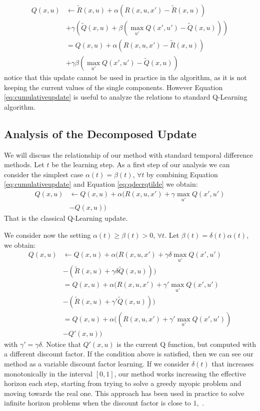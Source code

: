 \documentclass[conference]{IEEEtran}
\begin{document}
\begin{align}
Q(x,u) & \leftarrow\tilde{R}(x,u)+\alpha(R(x,u,x')-\tilde{R}(x,u)) \nonumber\\
 & +\gamma\left(\tilde{Q}(x,u)+\beta(\max_{u'}Q(x',u')-\tilde{Q}(x,u))\right) \nonumber\\
 & =Q(x,u)+\alpha(R(x,u,x')-\tilde{R}(x,u)) \nonumber\\
 & +\gamma\beta(\max_{u'}Q(x',u')-\tilde{Q}(x,u))
 \label{eq:cumulativeupdate}
\end{align}
notice that this update cannot be used in practice in the algorithm, as it is not keeping the current values of the single components. However Equation \ref{eq:cumulativeupdate} is useful to analyze the relations to standard Q-Learning algorithm.

\subsection{Analysis of the Decomposed Update}
We will discuss the relationship of our method with standard temporal difference methods. Let $t$ be the learning step. As a first step of our analysis we can consider the simplest case $\alpha(t)=\beta(t)$, $\forall t$ by combining Equation \ref{eq:cumulativeupdate} and Equation \ref{eq:qdecrqtilde} we obtain:
\begin{align}
Q(x,u) & \leftarrow Q(x,u)+\alpha(R(x,u,x')+\gamma\max_{u'}Q(x',u')\nonumber\\
 & -Q(x,u))
\end{align}
That is the classical Q-Learning update. 

We consider now the setting $\alpha(t)\geq\beta(t)>0$, $\forall t$. Let $\beta(t)=\delta(t)\alpha(t)$, we obtain:
\begin{align}
Q(x,u) & \leftarrow Q(x,u)+\alpha(R(x,u,x')+\gamma\delta \max_{u'}Q(x',u') \nonumber\\
 & -(\tilde{R}(x,u)+\gamma\delta\tilde{Q}(x,u))) \nonumber\\
 & =Q(x,u)+\alpha(R(x,u,x')+\gamma'\max_{u'}Q(x',u') \nonumber\\
 & -(\tilde{R}(x,u)+\gamma'\tilde{Q}(x,u))) \nonumber\\
 & =Q(x,u)+\alpha((R(x,u,x')+\gamma'\max_{u'}Q(x',u')) \nonumber\\
 & -Q'(x,u))
\end{align}
with $\gamma'=\gamma\delta$. Notice that $Q'(x,u)$ is the current Q function, but computed with a different discount factor. If the condition above is satisfied, then we can see our method as a variable discount factor learning. If we consider $\delta(t)$ that increases monotonically in the interval $[0,1]$, our method works increasing the effective horizon each step, starting from trying to solve a greedy myopic problem and moving towards the real one. This approach has been used in practice to solve infinite horizon problems when the discount factor is close to $1$,~\cite{}.
\end{document}
